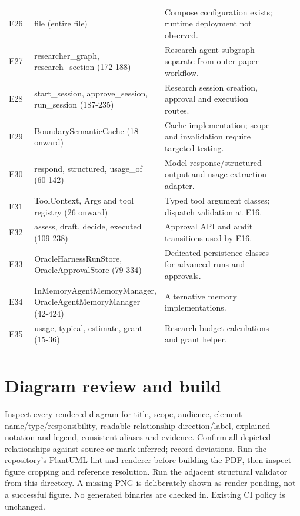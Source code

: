\documentclass[10pt,letterpaper]{article}
\begin{document}
\begin{longtable}{@{}>{\raggedright\arraybackslash}p{0.1\linewidth}>{\raggedright\arraybackslash}p{0.32\linewidth}>{\raggedright\arraybackslash}p{0.5\linewidth}@{}}
E26 & file (entire file) & Compose configuration exists; runtime deployment not observed.\\\addlinespace
E27 & researcher\_graph, research\_section (172-188) & Research agent subgraph separate from outer paper workflow.\\\addlinespace
E28 & start\_session, approve\_session, run\_session (187-235) & Research session creation, approval and execution routes.\\\addlinespace
E29 & BoundarySemanticCache (18 onward) & Cache implementation; scope and invalidation require targeted testing.\\\addlinespace
E30 & respond, structured, usage\_of (60-142) & Model response/structured-output and usage extraction adapter.\\\addlinespace
E31 & ToolContext, Args and tool registry (26 onward) & Typed tool argument classes; dispatch validation at E16.\\\addlinespace
E32 & assess, draft, decide, executed (109-238) & Approval API and audit transitions used by E16.\\\addlinespace
E33 & OracleHarnessRunStore, OracleApprovalStore (79-334) & Dedicated persistence classes for advanced runs and approvals.\\\addlinespace
E34 & InMemoryAgentMemoryManager, OracleAgentMemoryManager (42-424) & Alternative memory implementations.\\\addlinespace
E35 & usage, typical, estimate, grant (15-36) & Research budget calculations and grant helper.\\\addlinespace
\bottomrule\end{longtable}
\section{Diagram review and build}
Inspect every rendered diagram for title, scope, audience, element name/type/responsibility, readable relationship direction/label, explained notation and legend, consistent aliases and evidence. Confirm all depicted relationships against source or mark inferred; record deviations. Run the repository's PlantUML lint and renderer before building the PDF, then inspect figure cropping and reference resolution. Run the adjacent structural validator from this directory. A missing PNG is deliberately shown as render pending, not a successful figure. No generated binaries are checked in. Existing CI policy is unchanged.
\end{document}

